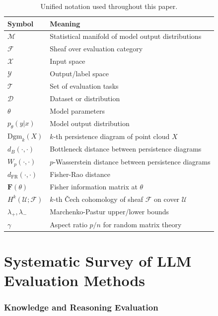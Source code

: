 \documentclass[11pt]{article}
\newcommand{\cM}{\mathcal{M}}
\newcommand{\cF}{\mathcal{F}}
\newcommand{\cX}{\mathcal{X}}
\newcommand{\cY}{\mathcal{Y}}
\newcommand{\cD}{\mathcal{D}}
\newcommand{\cT}{\mathcal{T}}
\newcommand{\cU}{\mathcal{U}}
\newcommand{\dgm}{\mathrm{Dgm}}
\newcommand{\bott}{d_B}
\newcommand{\wass}{W_p}
\newcommand{\FR}{d_{\mathrm{FR}}}
\newcommand{\Fish}{\mathbf{F}}
\begin{document}
\begin{table}[h]
\centering
\caption{Unified notation used throughout this paper.}
\label{tab:notation}
\small
\begin{tabular}{@{}ll@{}}
\toprule
\textbf{Symbol} & \textbf{Meaning} \\
\midrule
$\cM$ & Statistical manifold of model output distributions \\
$\cF$ & Sheaf over evaluation category \\
$\cX$ & Input space \\
$\cY$ & Output/label space \\
$\cT$ & Set of evaluation tasks \\
$\cD$ & Dataset or distribution \\
$\theta$ & Model parameters \\
$p_\theta(y|x)$ & Model output distribution \\
$\dgm_k(X)$ & $k$-th persistence diagram of point cloud $X$ \\
$\bott(\cdot,\cdot)$ & Bottleneck distance between persistence diagrams \\
$\wass(\cdot,\cdot)$ & $p$-Wasserstein distance between persistence diagrams \\
$\FR(\cdot,\cdot)$ & Fisher-Rao distance \\
$\Fish(\theta)$ & Fisher information matrix at $\theta$ \\
$H^k(\cU;\cF)$ & $k$-th \v{C}ech cohomology of sheaf $\cF$ on cover $\cU$ \\
$\lambda_+, \lambda_-$ & Marchenko-Pastur upper/lower bounds \\
$\gamma$ & Aspect ratio $p/n$ for random matrix theory \\
\bottomrule
\end{tabular}
\end{table}



\part{Systematic Survey of LLM Evaluation Methods}
\label{part:survey}

\section{Knowledge and Reasoning Evaluation}
\label{sec:knowledge}
\end{document}
